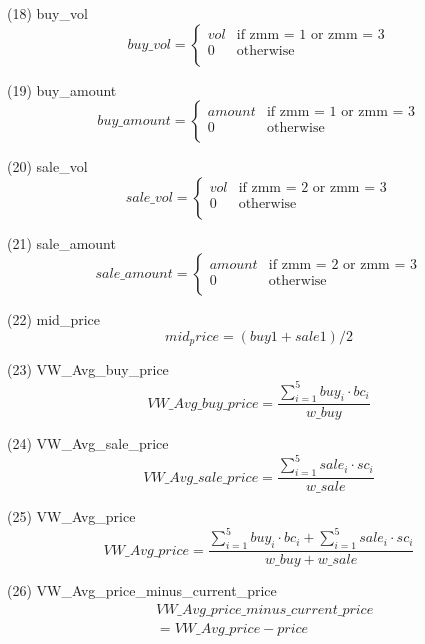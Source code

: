 \documentclass[10pt, conference, compsocconf]{IEEEtran}
\begin{document}
\begin{enumerate}
	(18) buy\_vol\\
	$$
		buy\_vol = 
		\begin{cases}
			vol & \text{if zmm = 1 or zmm = 3}\\
			0 & \text{otherwise}\\
		\end{cases}
	$$

	(19) buy\_amount\\
	$$
		buy\_amount = 
		\begin{cases}
			amount & \text{if zmm = 1 or zmm = 3}\\
			0 & \text{otherwise}\\
		\end{cases}
	$$

	(20) sale\_vol\\
	$$
	sale\_vol = 
	\begin{cases}
		vol & \text{if zmm = 2 or zmm = 3}\\
		0 & \text{otherwise}\\
	\end{cases}
	$$

	(21) sale\_amount\\
	$$
	sale\_amount = 
	\begin{cases}
		amount & \text{if zmm = 2 or zmm = 3}\\
		0 & \text{otherwise}\\
	\end{cases}
	$$

	(22) mid\_price\\
	$$
		mid_price = (buy1 + sale1) / 2
	$$

	(23) VW\_Avg\_buy\_price\\
	$$
		VW\_Avg\_buy\_price = \frac{\sum_{i=1}^{5}buy_i \cdot bc_i}{w\_buy}
	$$

	(24) VW\_Avg\_sale\_price\\
	$$
		VW\_Avg\_sale\_price = \frac{\sum_{i=1}^{5}sale_i \cdot sc_i}{w\_sale}
	$$

	(25) VW\_Avg\_price\\
	$$
		VW\_Avg\_price = \frac{\sum_{i=1}^{5}buy_i \cdot bc_i + \sum_{i=1}^{5}sale_i \cdot sc_i}{w\_buy + w\_sale}
	$$

	(26) VW\_Avg\_price\_minus\_current\_price\\
	$$
	\begin{aligned}
		&VW\_Avg\_price\_minus\_current\_price \\
		&= VW\_Avg\_price - price
	\end{aligned}
	$$


\end{enumerate}
\end{document}
